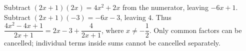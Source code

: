 Subtract $(2x+1)(2x)=4x^2+2x$ from the numerator, leaving $-6x+1$. Subtract $(2x+1)(-3)=-6x-3$, leaving $4$. Thus $\boxed{\dfrac{4x^2-4x+1}{2x+1}=2x-3+\dfrac{4}{2x+1}}$, where $x\ne-\dfrac{1}{2}$. Only common factors can be cancelled; individual terms inside sums cannot be cancelled separately.
